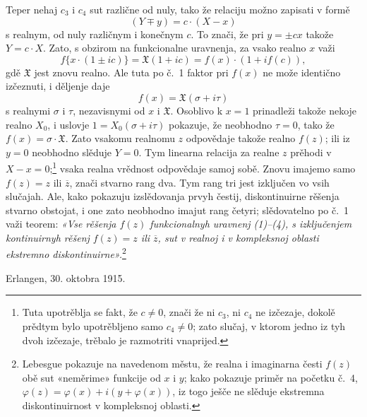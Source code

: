 \documentclass[11pt]{article}
\providecommand{\Xreal}{\mathfrak X}
\begin{document}
Teper nehaj \(c_3\) i \(c_4\) sut različne od nuly, tako že relaciju možno zapisati v formě
\[
(Y\mp y)=c\cdot(X-x)
\]
s realnym, od nuly različnym i konečnym \(c\). To znači, že pri \(y=\pm cx\) takože \(Y=c\cdot X\). Zato, s obzirom na funkcionalne uravnenja, za vsako realno \(x\) važi
\[
f\{x\cdot(1\pm ic)\}=\Xreal(1+ic)=f(x)\cdot(1+i f(c)),
\]
gdě \(\Xreal\) jest znovu realno. Ale tuta po č.~1 faktor pri \(f(x)\) ne može identično izčeznuti, i děljenje daje
\[
f(x)=\Xreal(\sigma+i\tau)
\]
s realnymi \(\sigma\) i \(\tau\), nezavisnymi od \(x\) i \(\Xreal\). Osoblivo k \(x=1\) prinadleži takože nekoje realno \(X_0\), i uslovje \(1=X_0(\sigma+i\tau)\) pokazuje, že neobhodno \(\tau=0\), tako že \(f(x)=\sigma\cdot\Xreal\). Zato vsakomu realnomu \(z\) odpovědaje takože realno \(f(z)\); ili iz \(y=0\) neobhodno slěduje \(Y=0\). Tym linearna relacija za realne \(z\) prěhodi v \(X-x=0\);\footnote{Tuta upotrěblja se fakt, že \(c\ne0\), znači že ni \(c_3\), ni \(c_4\) ne izčezaje, dokolě prědtym bylo upotrěbljeno samo \(c_4\ne0\); zato slučaj, v ktorom jedno iz tyh dvoh izčezaje, trěbalo je razmotriti vnaprijed.} vsaka realna vrědnost odpovědaje samoj sobě. Znovu imajemo samo \(f(z)=z\) ili \(\overline z\), znači stvarno rang dva. Tym rang tri jest izključen vo vsih slučajah. Ale, kako pokazuju izslědovanja prvyh čestij, diskontinuirne rěšenja stvarno obstojat, i one zato neobhodno imajut rang četyri; slědovatelno po č.~1 važi teorem: {\itshape «Vse rěšenja \(f(z)\) funkcionalnyh uravnenj (1)--(4), s izključenjem kontinuirnyh rěšenj \(f(z)=z\) ili \(\overline z\), sut v realnoj i v kompleksnoj oblasti ekstremno diskontinuirne».}\footnote{Lebesgue pokazuje na navedenom městu, že realna i imaginarna česti \(f(z)\) obě sut «neměrime» funkcije od \(x\) i \(y\); kako pokazuje priměr na početku č.~4, \(\varphi(z)=\varphi(x)+i(y+\varphi(x))\), iz togo ješče ne slěduje ekstremna diskontinuirnost v kompleksnoj oblasti.}

\medskip
\noindent Erlangen, 30. oktobra 1915.
\end{document}
